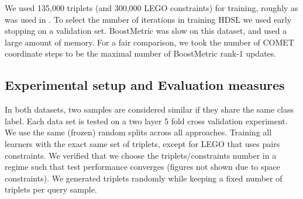 \documentclass{article} %
\begin{document}
We used 135,000 triplets (and 300,000 LEGO constraints) for training, roughly as was used in \cite{OASIS}. To select the number of iterations in training HDSL we used early stopping on a validation set. BoostMetric was slow on this dataset, and used a large amount of memory. For a fair comparison, we took the number of COMET coordinate steps to be the maximal number of BoostMetric rank-1 updates.

\subsection{Experimental setup and Evaluation measures}
In both datasets, two samples are considered similar if they share the same class label. Each data set is tested on a two layer 5 fold cross validation experiment. We use the same (frozen) random splits across all approaches. Training all learners with the exact same set of triplets, except for LEGO that uses pairs constraints. We verified that we choose the triplets/constraints number in a regime such that test performance converges (figures not shown due to space constraints). We generated triplets randomly while keeping a fixed number of triplets per query sample.
\end{document}
